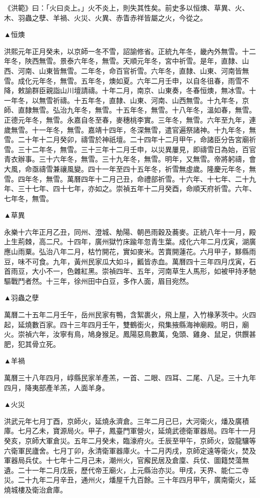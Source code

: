 \begin{pinyinscope}
《洪範》曰：「火曰炎上。」火不炎上，則失其性矣。前史多以恒燠、草異、火、木、羽蟲之孽、羊禍、火災、火異、赤眚赤祥皆屬之火，今從之。

▲恒燠

洪熙元年正月癸未，以京師一冬不雪，詔諭修省。正統九年冬，畿內外無雪。十二年冬，陜西無雪。景泰六年冬，無雪。天順元年冬，宮中祈雪。是年，直隸、山西、河南、山東皆無雪。二年冬，命百官祈雪。六年冬，直隸、山東、河南皆無雪。成化元年冬，無雪。五年冬，燠如夏。六年二月壬申，以自冬徂春，雨雪不降，敕諭群臣親詣山川壇請禱。十年二月，南京、山東奏，冬春恒燠，無冰雪。十一年冬，以無雪祈禱。十五年冬，直隸、山東、河南、山西無雪。十九年冬，京師、直隸無雪。弘治九年冬，無雪。十五年冬，無雪。十八年冬，溫如春，無雪。正德元年冬，無雪。永嘉自冬至春，麥穗桃李實。三年冬，無雪。六年至九年，連歲無雪。十一年冬，無雪。嘉靖十四年，冬深無雪，遣官遍祭諸神。十九年冬，無雪。二十年十二月癸卯，禱雪於神祇壇。二十四年十二月甲午，命諸臣分告宮廟祈雪。三十二年冬，無雪。三十三年十二月壬申，以災異屢見，即禱雪日為始，百官青衣辦事。三十六年冬，無雪。三十九年冬，無雪。明年，又無雪。帝將躬禱，會大風，命亟禱雪兼禳風變。四十一年至四十五年冬，祈雪無虛歲。隆慶元年冬，無雪。四年冬，無雪。萬曆四年十二月己丑，命禮部祈雪。十六年、十七年、二十九年、三十七年、四十七年，亦如之。崇禎五年十二月癸酉，命順天府祈雪。六年、七年冬，無雪。

▲草異

永樂十六年正月乙丑，同州、澄城、觔陽、朝邑雨穀及蕎麥。正統八年十一月，殿上生荊棘，高二尺。十四年，廣州獄竹床踰年忽青生葉。成化六年二月戊寅，湖廣應山雨粟。弘治八年二月，枯竹開花，實如麥米。苦賣開蓮花。六月甲子，黟縣雨豆，味不可食。九年，黃州民家瓜大如斗，瓤皆赤血。萬曆四十三年四月戊寅，石首雨豆，大小不一，色雜紅黑。崇禎四年、五年，河南草生人馬形，如被甲持矛馳驅戰鬥者然。十三年，徐州田中白豆，多作人面，眉目宛然。

▲羽蟲之孽

萬曆二十五年二月壬午，岳州民家有鴨，含絮裹火，飛上屋，入竹椽茅茨中。火四起，延燒數百家。四十三年四月壬午，雙鶴銜火，飛集掖縣海神廟殿。明日，廟火。崇禎六年，汝寧有鳥，鳩身猴足。鳳陽惡鳥數萬，兔頭、雞身、鼠足，供饌甚肥，犯其骨立死。

▲羊禍

萬曆三十八年四月，崞縣民家羊產羔，一首、二眼、四耳、二尾、八足。三十九年四月，降夷部產羊羔，人面羊身。

▲火災

洪武元年七月丁酉，京師火，延燒永濟倉。三年二月己巳，大河衛火，燔及廣積庫。七月乙未，寶源局火。甲子，鳳臺門軍營火，延燒武德衛軍器局。四年十一月癸亥，京師大軍倉災。五年二月癸未，臨濠府火。壬辰至甲午，京師火，毀龍驤等六衛軍民廬舍。七月丁卯，永清衛軍器庫火。十二月丙戌，京師定遠等衛火，焚及軍器局兵仗。十七年十二月己未，潮州火，官廨民居及倉廩、兵仗、圖籍焚蕩無遺。二十一年二月戊辰，歷代帝王廟火，上元縣治亦災。甲戌，天界、能仁二寺災。二十九年二月辛丑，通州火，燔屋千九百餘。三十年四月甲午，廣南衛火，延燒城樓及衛治倉庫。


\end{pinyinscope}
